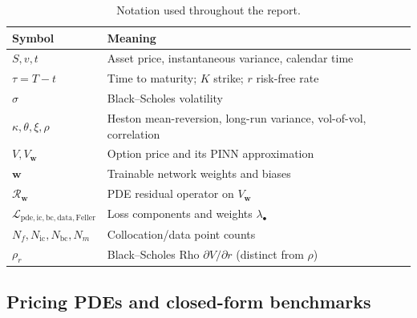 \begin{table}[!htbp]
    \centering
    \footnotesize
    \setlength{\tabcolsep}{4pt}
    \renewcommand{\arraystretch}{1.05}
    \caption{Notation used throughout the report.}
    \label{tab:notation}
    \begin{tabularx}{\linewidth}{@{} l X @{}}
        \toprule
        \textbf{Symbol} & \textbf{Meaning} \\
        \midrule
        $S,v,t$ & Asset price, instantaneous variance, calendar time \\
        $\tau=T-t$ & Time to maturity; $K$ strike; $r$ risk-free rate \\
        $\sigma$ & Black--Scholes volatility \\
        $\kappa,\theta,\xi,\rho$ & Heston mean-reversion, long-run variance, vol-of-vol, correlation \\
        $V,V_{\boldsymbol{w}}$ & Option price and its PINN approximation \\
        $\boldsymbol{w}$ & Trainable network weights and biases \\
        $\mathcal{R}_{\boldsymbol{w}}$ & PDE residual operator on $V_{\boldsymbol{w}}$ \\
        $\mathcal{L}_{\mathrm{pde,ic,bc,data,Feller}}$ & Loss components and weights $\lambda_{\bullet}$ \\
        $N_f,N_{\mathrm{ic}},N_{\mathrm{bc}},N_m$ & Collocation/data point counts \\
        $\rho_r$ & Black--Scholes Rho $\partial V/\partial r$ (distinct from $\rho$) \\
        \bottomrule
    \end{tabularx}
\end{table}

\subsection{Pricing PDEs and closed-form benchmarks}\label{subsec:pdes}

